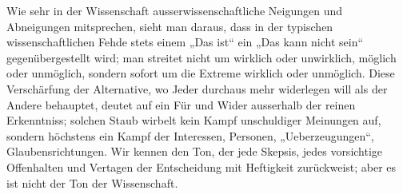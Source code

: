 Wie sehr in der Wissenschaft ausserwissenschaftliche Neigungen und Abneigungen mitsprechen, sieht man daraus, dass in der typischen wissenschaftlichen Fehde stets einem „Das ist“ ein „Das kann nicht sein“ gegenübergestellt wird; man streitet nicht um wirklich oder unwirklich, möglich oder unmöglich, sondern sofort um die Extreme wirklich oder unmöglich. Diese Verschärfung der Alternative, wo Jeder durchaus mehr widerlegen will als der Andere behauptet, deutet auf ein Für und Wider ausserhalb der reinen Erkenntniss; solchen Staub wirbelt kein Kampf unschuldiger Meinungen auf, sondern höchstens ein Kampf der Interessen, Personen, „Ueberzeugungen“, Glaubensrichtungen. Wir kennen den Ton, der jede Skepsis, jedes vorsichtige Offenhalten und Vertagen der Entscheidung mit Heftigkeit zurückweist; aber es ist nicht der Ton der Wissenschaft.
\par

